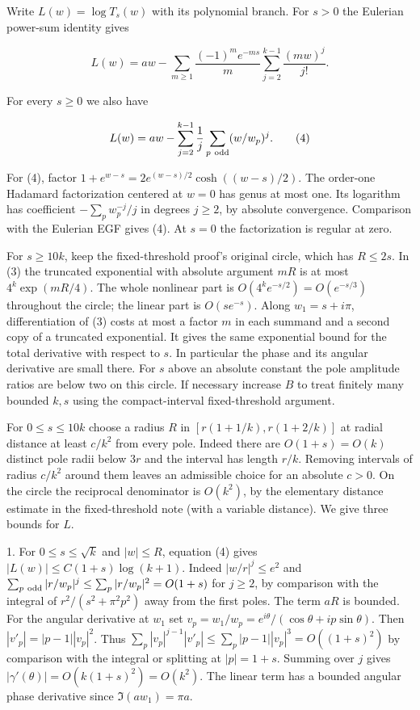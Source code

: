 \documentclass[11pt]{article}
\begin{document}
Write $L(w)=\log T_s(w)$ with its polynomial branch. For $s>0$ the Eulerian power-sum identity gives

\[
 L(w)=aw-\sum_{m\ge1}\frac{(-1)^m e^{-ms}}{m}
                       \sum_{j=2}^{k-1}\frac{(mw)^j}{j!}.
 \tag{3}
\]

For every $s\ge0$ we also have

\[
 L(w)=aw-\sum_{j=2}^{k-1}\frac1j\sum_{p\ {\rm odd}}(w/w_p)^j.
 \tag{4}
\]

For (4), factor $1+e^{w-s}=2e^{(w-s)/2}\cosh((w-s)/2)$. The order-one Hadamard factorization centered at $w=0$ has genus at most one. Its logarithm has coefficient $-\sum_p w_p^{-j}/j$ in degrees $j\ge2$, by absolute convergence. Comparison with the Eulerian EGF gives (4). At $s=0$ the factorization is regular at zero.

For $s\ge10k$, keep the fixed-threshold proof's original circle, which has $R\le2s$. In (3) the truncated exponential with absolute argument $mR$ is at most $4^k\exp(mR/4)$. The whole nonlinear part is $O(4^k e^{-s/2})=O(e^{-s/3})$ throughout the circle; the linear part is $O(se^{-s})$. Along $w_1=s+i\pi$, differentiation of (3) costs at most a factor $m$ in each summand and a second copy of a truncated exponential. It gives the same exponential bound for the total derivative with respect to $s$. In particular the phase and its angular derivative are small there. For $s$ above an absolute constant the pole amplitude ratios are below two on this circle. If necessary increase $B$ to treat finitely many bounded $k,s$ using the compact-interval fixed-threshold argument.

For $0\le s\le10k$ choose a radius $R$ in $[r(1+1/k),r(1+2/k)]$ at radial distance at least $c/k^2$ from every pole. Indeed there are $O(1+s)=O(k)$ distinct pole radii below $3r$ and the interval has length $r/k$. Removing intervals of radius $c/k^2$ around them leaves an admissible choice for an absolute $c>0$. On the circle the reciprocal denominator is $O(k^2)$, by the elementary distance estimate in the fixed-threshold note (with a variable distance). We give three bounds for $L$.

1. For $0\le s\le\sqrt k$ and $|w|\le R$, equation (4) gives $|L(w)|\le C(1+s)\log(k+1)$. Indeed $|w/r|^j\le e^2$ and $\sum_{p\ {\rm odd}} |r/w_p|^j\le \sum_p |r/w_p|^2=O(1+s)$ for $j\ge2$, by comparison with the integral of $r^2/(s^2+\pi^2 p^2)$ away from the first poles. The term $aR$ is bounded. For the angular derivative at $w_1$ set $v_p=w_1/w_p=e^{i\theta}/(\cos\theta+ip\sin\theta)$. Then $|v'_p|=|p-1||v_p|^2$. Thus $\sum_p |v_p|^{j-1}|v'_p|\le\sum_p|p-1||v_p|^3=O((1+s)^2)$ by comparison with the integral or splitting at $|p|=1+s$. Summing over $j$ gives $|\gamma'(\theta)|=O(k(1+s)^2)=O(k^2)$. The linear term has a bounded angular phase derivative since $\Im(aw_1)=\pi a$.
\end{document}
